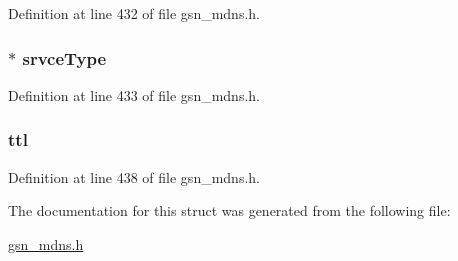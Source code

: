 Definition at line 432 of file gsn\_\-mdns.h.

\hypertarget{a00149_ae936821f0b28aba244cd7270eab50b96}{
\subsubsection[{srvceType}]{$\ast$ {\bf srvceType}}}
\label{a00149_ae936821f0b28aba244cd7270eab50b96}


Definition at line 433 of file gsn\_\-mdns.h.

\hypertarget{a00149_af96204bb13dce2fe8a0dac78b29c40a4}{
\subsubsection[{ttl}]{ {\bf ttl}}}
\label{a00149_af96204bb13dce2fe8a0dac78b29c40a4}


Definition at line 438 of file gsn\_\-mdns.h.



The documentation for this struct was generated from the following file:\begin{DoxyCompactItemize}
\item 
\hyperlink{a00526}{gsn\_\-mdns.h}\end{DoxyCompactItemize}
